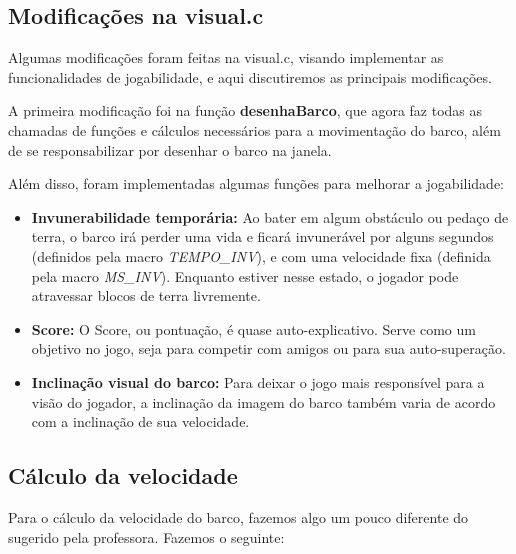 \documentclass[11pt]{article}
\begin{document}
\subsection{Modificações na visual.c}

Algumas modificações foram feitas na visual.c, visando implementar as funcionalidades de jogabilidade, e aqui discutiremos as principais modificações.

A primeira modificação foi na função \textbf{desenhaBarco}, que agora faz todas as chamadas de funções e cálculos necessários para a movimentação do barco, além de se responsabilizar por desenhar o barco na janela.

Além disso, foram implementadas algumas funções para melhorar a jogabilidade:

\begin{itemize}

\item \textbf{Invunerabilidade temporária:} Ao bater em algum obstáculo ou pedaço de terra, o barco irá perder uma vida e ficará invunerável por alguns segundos (definidos pela macro \textit{TEMPO\_{}INV}), e com uma velocidade fixa (definida pela macro \textit{MS\_{}INV}). Enquanto estiver nesse estado, o jogador pode atravessar blocos de terra livremente.

\item \textbf{Score:} O Score, ou pontuação, é quase auto-explicativo. Serve como um objetivo no jogo, seja para competir com amigos ou para sua auto-superação.

\item \textbf{Inclinação visual do barco:} Para deixar o jogo mais responsível para a visão do jogador, a inclinação da imagem do barco também varia de acordo com a inclinação de sua velocidade.


\end{itemize}


\subsection{Cálculo da velocidade}

Para o cálculo da velocidade do barco, fazemos algo um pouco diferente do sugerido pela professora. Fazemos o seguinte:
\end{document}
